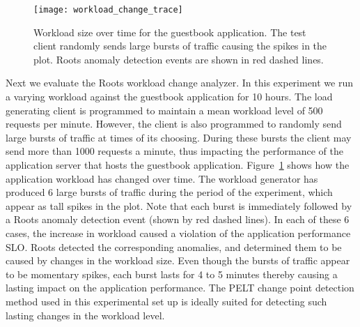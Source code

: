 \begin{figure}
\centering
\texttt{[image: workload\_change\_trace]}
\caption{Workload size over time for the guestbook application. The test client randomly sends
large bursts of traffic causing the spikes in the plot. Roots anomaly detection events are shown
in red dashed lines.}
\label{fig:workload_change}
\end{figure}

Next we evaluate the Roots workload change analyzer. In this experiment we run a varying workload
against the guestbook application for 10 hours. The load generating client is programmed
to maintain a mean workload level of 500 requests per minute. However, the client
is also programmed to randomly send large bursts of traffic at times of its choosing. During these bursts 
the client may send more than 1000 requests a minute, thus impacting the performance of
the application server that hosts the guestbook application. Figure~\ref{fig:workload_change} shows how
the application workload has changed over time. The workload generator has produced 6 large bursts of traffic during the 
period of the experiment, which appear as tall spikes in the plot.
Note that each burst is immediately followed by a Roots anomaly detection event (shown by red dashed lines). 
In each of these 6 cases, the increase in workload caused a violation of the application performance SLO.
Roots detected the corresponding anomalies, and determined them to be caused by changes in the workload size.
Even though the bursts of traffic appear to be momentary
spikes, each burst lasts for 4 to 5 minutes thereby causing a lasting impact on the application performance.
The PELT change point detection method used in this experimental set up is ideally suited for detecting
such lasting changes in the workload level.
